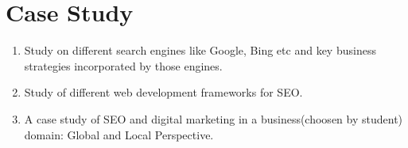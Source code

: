 


\section{Case Study}
\begin{enumerate}
    \item  Study on different search engines like Google, Bing etc and key business strategies incorporated by those engines.
    \item Study of different web development frameworks for SEO.
    \item A case study of SEO and digital marketing in a business(choosen by student) domain: Global and Local Perspective.
\end{enumerate}
